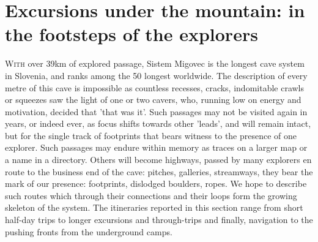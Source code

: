 \part{Excursions under the mountain: in the footsteps of the explorers}
	\lettrine{W}{ith} over 39km of explored passage, Sistem Migovec is the longest cave system in Slovenia, and ranks among the 50 longest worldwide. The description of every metre of this cave is impossible as countless recesses, cracks, indomitable crawls or squeezes saw the light of one or two cavers, who, running low on energy and motivation, decided that 'that was it'. Such passages may not be visited again in years, or indeed ever, as focus shifts towards other 'leads', and will remain intact, but for the single track of footprints that bears witness to the presence of one explorer. Such passages may endure within memory as traces on a larger map or a name in a directory. Others will become highways, passed by many explorers en route to the business end of the cave: pitches, galleries, streamways, they bear the mark of our presence: footprints, dislodged boulders, ropes. We hope to describe such routes which through their connections and their loops form the growing skeleton of the system. The itineraries reported in this section range from short half-day trips  to longer excursions and through-trips and finally, navigation to the pushing fronts from the underground camps.
	\\
	\\
	\\